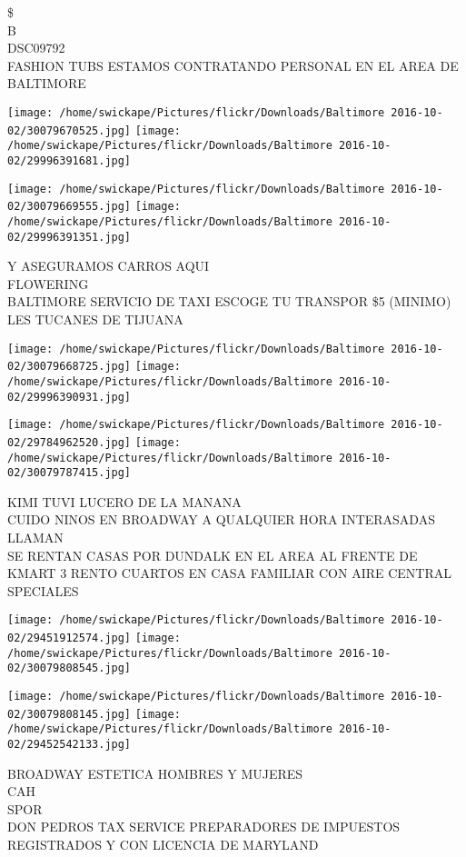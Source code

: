 \documentclass[10pt,letterpaper]{article}
\begin{document}
\$\\
B\\
DSC09792\\
FASHION TUBS ESTAMOS CONTRATANDO PERSONAL EN EL AREA DE BALTIMORE
\pagebreak

\texttt{[image: /home/swickape/Pictures/flickr/Downloads/Baltimore 2016-10-02/30079670525.jpg]}
\texttt{[image: /home/swickape/Pictures/flickr/Downloads/Baltimore 2016-10-02/29996391681.jpg]}

\texttt{[image: /home/swickape/Pictures/flickr/Downloads/Baltimore 2016-10-02/30079669555.jpg]}
\texttt{[image: /home/swickape/Pictures/flickr/Downloads/Baltimore 2016-10-02/29996391351.jpg]}

Y ASEGURAMOS CARROS AQUI\\
FLOWERING\\
BALTIMORE SERVICIO DE TAXI ESCOGE TU TRANSPOR \$5 (MINIMO)\\
LES TUCANES DE TIJUANA
\pagebreak

\texttt{[image: /home/swickape/Pictures/flickr/Downloads/Baltimore 2016-10-02/30079668725.jpg]}
\texttt{[image: /home/swickape/Pictures/flickr/Downloads/Baltimore 2016-10-02/29996390931.jpg]}

\texttt{[image: /home/swickape/Pictures/flickr/Downloads/Baltimore 2016-10-02/29784962520.jpg]}
\texttt{[image: /home/swickape/Pictures/flickr/Downloads/Baltimore 2016-10-02/30079787415.jpg]}

KIMI TUVI LUCERO DE LA MANANA\\
CUIDO NINOS EN BROADWAY A QUALQUIER HORA INTERASADAS LLAMAN\\
SE RENTAN CASAS POR DUNDALK EN EL AREA AL FRENTE DE KMART 3 RENTO CUARTOS EN CASA FAMILIAR CON AIRE CENTRAL\\
SPECIALES
\pagebreak

\texttt{[image: /home/swickape/Pictures/flickr/Downloads/Baltimore 2016-10-02/29451912574.jpg]}
\texttt{[image: /home/swickape/Pictures/flickr/Downloads/Baltimore 2016-10-02/30079808545.jpg]}

\texttt{[image: /home/swickape/Pictures/flickr/Downloads/Baltimore 2016-10-02/30079808145.jpg]}
\texttt{[image: /home/swickape/Pictures/flickr/Downloads/Baltimore 2016-10-02/29452542133.jpg]}

BROADWAY ESTETICA HOMBRES Y MUJERES\\
CAH\\
SPOR\\
DON PEDROS TAX SERVICE PREPARADORES DE IMPUESTOS REGISTRADOS Y CON LICENCIA DE MARYLAND
\pagebreak
\end{document}
